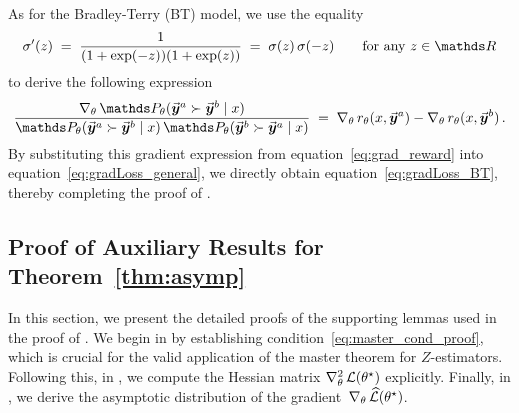 	As for the Bradley-Terry (BT) model, we use the equality
	\begin{align*}
		\divsigmoid(z) \; = \; \frac{1}{(1 + \exp(-z))(1 + \exp(z))} \; = \; \sigmoid(z) \, \sigmoid(-z)
		\qquad \mbox{for any $z \in \Real$}
	\end{align*}
	to derive the following expression
	\begin{align}
		\label{eq:grad_reward}
		\frac{\gradtheta \Probtheta( \responseone \succ \responsetwo \mid \prompt )}{\Probtheta( \responseone \succ \responsetwo \mid \prompt ) \, \Probtheta( \responsetwo \succ \responseone \mid \prompt )}
		\; = \; \gradtheta \rewardtheta(\prompt, \responseone) - \gradtheta \rewardtheta(\prompt, \responsetwo) \, .
	\end{align}
	By substituting this gradient expression from equation~\eqref{eq:grad_reward} into equation~\eqref{eq:gradLoss_general}, we directly obtain equation~\eqref{eq:gradLoss_BT}, thereby completing the proof of .
	
	

	\subsection{Proof of Auxiliary Results for Theorem~\ref{thm:asymp} \yaqidone}
	\label{sec:proof:thm:asymp_aux}
	
	In this section, we present the detailed proofs of the supporting lemmas used in the proof of . 
	We begin in  by establishing condition~\eqref{eq:master_cond_proof}, which is crucial for the valid application of the master theorem for $Z$-estimators. Following this, in , we compute the Hessian matrix $\nabla_{\theta}^2 \,  \mathcal{L}(\theta^{\star})$ explicitly. Finally, in , we derive the asymptotic distribution of the gradient~$\nabla_{\theta} \,  \widehat{\mathcal{L}}(\theta^{\star})$.
	
	

